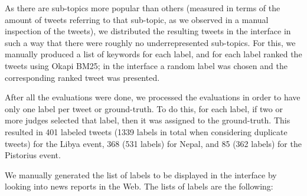 As there are sub-topics more popular than others (measured in terms of the
amount of tweets referring to that sub-topic, as we observed in a manual
inspection of the tweets), we distributed the resulting tweets in the interface
in such a way that there were roughly no underrepresented sub-topics.
%
For this, we manually produced a list of keywords for each label, and for each
label ranked the tweets using Okapi BM25;
%
in the interface a random label was chosen and the corresponding ranked tweet
was presented.


After all the evaluations were done, we processed the evaluations in order to
have only one label per tweet or ground-truth.
%
To do this, for each label, if two or more judges selected that label, then it
was assigned to the ground-truth.
%
This resulted in 401 labeled tweets (1339 labels in total when considering
duplicate tweets) for the Libya event, 368 (531 labels) for Nepal, and 85 (362
labels) for the Pistorius event.

%
We manually generated the list of labels to be displayed in the interface by
looking into news reports in the Web.
%
The lists of labels are the following:

